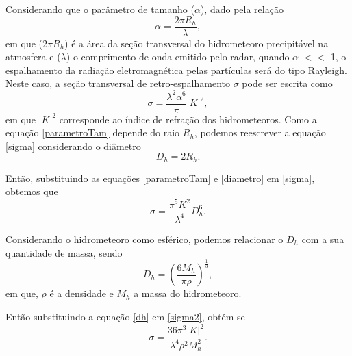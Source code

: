 Considerando que o parâmetro de tamanho ($\alpha$), dado pela relação 
\begin{equation}
\alpha = \dfrac{2\pi R_{h} }{\lambda},
\label{parametroTam} 
\end{equation}
em que ($2\pi R_{h}$) é a área da seção transversal do hidrometeoro  precipitável na atmosfera e ($\lambda$) o comprimento de onda emitido pelo radar, quando $\alpha$ $<<$ 1, o espalhamento da radiação eletromagnética pelas partículas será do tipo Rayleigh. Neste caso, a seção transversal de retro-espalhamento $\sigma$ pode ser escrita como 
\begin{equation}
\sigma = \dfrac{\lambda^2 \alpha^6}{\pi} |K|^2,
\label{sigma}
\end{equation}
em que $|K|^2$ corresponde ao índice de refração dos hidrometeoros. Como a equação \ref{parametroTam} depende do raio $R_h$, podemos reescrever a equação \ref{sigma} considerando o diâmetro 
\begin{equation}
D_h = 2 R_h.
\label{diametro}
\end{equation}


Então, substituindo as equações \ref{parametroTam} e \ref{diametro} em \ref{sigma}, obtemos que
\begin{equation}
\sigma = \dfrac{\pi^5 K^2  }{ \lambda^4 } D_h^6.
\label{sigma2}
\end{equation}

Considerando o hidrometeoro como esférico, podemos relacionar o $D_h$ com a sua quantidade de massa, sendo  
\begin{equation}
D_h = \left( \dfrac{6 M_h}{\pi \rho} \right)^{\frac{1}{3}},
\label{dh}
\end{equation}
em que, $\rho$ é a densidade e $M_h$ a massa do hidrometeoro.

Então substituindo a equação \ref{dh} em \ref{sigma2}, obtém-se
\begin{equation}
\sigma = \dfrac{36 \pi^3 |K|^2  }{ \lambda^4 \rho^2 M_h^2} .
\label{sigma3}
\end{equation}

